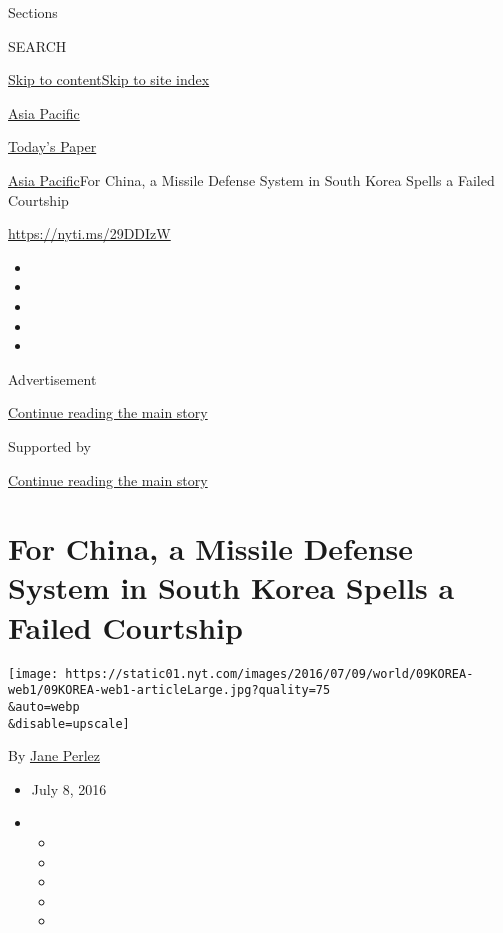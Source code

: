 Sections

SEARCH

\protect\hyperlink{site-content}{Skip to
content}\protect\hyperlink{site-index}{Skip to site index}

\href{https://www.nytimes.com/section/world/asia}{Asia Pacific}

\href{https://myaccount.nytimes.com/auth/login?response_type=cookie\&client_id=vi}{}

\href{https://www.nytimes.com/section/todayspaper}{Today's Paper}

\href{/section/world/asia}{Asia Pacific}\textbar{}For China, a Missile
Defense System in South Korea Spells a Failed Courtship

\url{https://nyti.ms/29DDIzW}

\begin{itemize}
\item
\item
\item
\item
\item
\end{itemize}

Advertisement

\protect\hyperlink{after-top}{Continue reading the main story}

Supported by

\protect\hyperlink{after-sponsor}{Continue reading the main story}

\hypertarget{for-china-a-missile-defense-system-in-south-korea-spells-a-failed-courtship}{%
\section{For China, a Missile Defense System in South Korea Spells a
Failed
Courtship}\label{for-china-a-missile-defense-system-in-south-korea-spells-a-failed-courtship}}

\texttt{[image: https://static01.nyt.com/images/2016/07/09/world/09KOREA-web1/09KOREA-web1-articleLarge.jpg?quality=75\\\&auto=webp\\\&disable=upscale]}

By \href{http://www.nytimes.com/by/jane-perlez}{Jane Perlez}

\begin{itemize}
\item
  July 8, 2016
\item
  \begin{itemize}
  \item
  \item
  \item
  \item
  \item
  \end{itemize}
\end{itemize}

